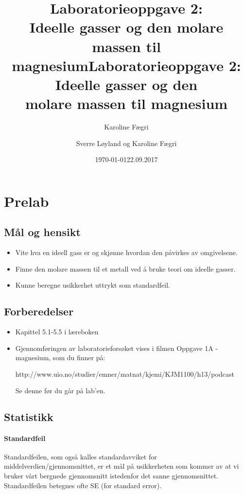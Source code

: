 \documentclass[12pt, a4]{article}
\title{Laboratorieoppgave 2:\\ Ideelle gasser og den molare massen til magnesium}
\author{Karoline Fægri}
\date{\today}
\title{Laboratorieoppgave 2:\\
	Ideelle gasser og den \\
	molare massen til magnesium}
\author{Sverre Løyland og Karoline Fægri}
\date{22.09.2017}
\begin{document}
	
	\maketitle
	
	\section{Prelab}
	
	\subsection{Mål og hensikt}
	\begin{itemize}
		\item Vite hva en ideell gass er og skjønne hvordan den påvirkes av omgivelsene.
		
		\item Finne den molare massen til et metall ved å bruke teori om ideelle gasser.
		
		\item Kunne beregne usikkerhet uttrykt som standardfeil. 
	\end{itemize}
	
	\subsection{Forberedelser}
	\begin{itemize}
		\item Kapittel 5.1-5.5 i læreboken
		
		\item Gjennomføringen av laboratorieforsøket vises i filmen Oppgave 1A - magnesium, som du finner på:
		
		http://www.uio.no/studier/emner/matnat/kjemi/KJM1100/h13/podcast
		
		Se denne før du går på lab'en.
	\end{itemize}
	
	\subsection{Statistikk}
	\paragraph{Standardfeil}
	Standardfeilen, som også kalles standardavviket for middelverdien/gjennomsnittet, er et mål på usikkerheten som kommer av at vi bruker vårt bergnede gjennomsnitt istedenfor det sanne gjennomsnittet. Standardfeilen betegnes ofte SE (for standard error).
	
\end{document}
